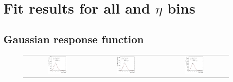 \appendix
\section{Fit results for all \pt and $\eta$ bins}\label{sec:ResFit:App:AllResults}
\subsection{Gaussian response function}\label{sec:ResFit:App:AllResults:Gauss}

\begin{figure}[ht]
  \centering
  \begin{tabular}{ccc}
    \includegraphics[width=0.3\textwidth]{figures/ResFit_Spring10QCDFlat_Gauss_Eta0_Spectrum_PtBin1} &
    \includegraphics[width=0.3\textwidth]{figures/ResFit_Spring10QCDFlat_Gauss_Eta0_Spectrum_PtBin2} &
    \includegraphics[width=0.3\textwidth]{figures/ResFit_Spring10QCDFlat_Gauss_Eta0_Spectrum_PtBin3} \\


\end{tabular}
\end{figure}
